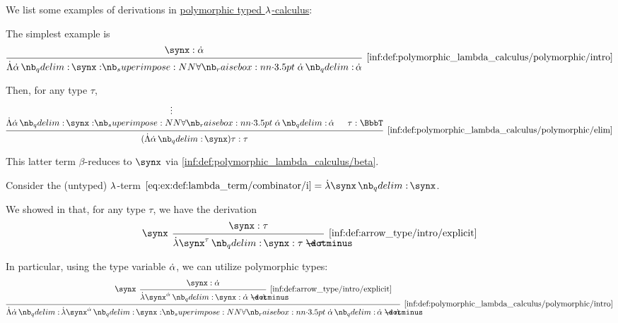 \begin{example}\label{ex:def:polymorphic_typed_lambda_calculus}
  We list some examples of derivations in \hyperref[def:polymorphic_typed_lambda_calculus]{polymorphic typed \( {\mathrm \lambda} \)-calculus}:
  \begin{thmenum}
     The simplest example is
    \begin{equation*}
      \begin{prooftree}
        \hypo{ \synx: \syn\alpha }
        \infer1[\ref{inf:def:polymorphic_lambda_calculus/polymorphic/intro}]{ \qAbs {\syn\alpha} \synx: \qforall {\syn\alpha} \syn\alpha }
      \end{prooftree}
    \end{equation*}

    Then, for any type \( \tau \),
    \begin{equation*}
      \begin{prooftree}
        \hypo{}
        \ellipsis {} { \qAbs {\syn\alpha} \synx: \qforall {\syn\alpha} \syn\alpha }

        \hypo{ \tau: \BbbT }

        \infer2[\ref{inf:def:polymorphic_lambda_calculus/polymorphic/elim}]{ (\qAbs {\syn\alpha} \synx) \tau: \tau }.
      \end{prooftree}
    \end{equation*}

    This latter term \( \beta \)-reduces to \( \synx \) via \ref{inf:def:polymorphic_lambda_calculus/beta}.

     Consider the (untyped) \( {\mathrm \lambda} \)-term \( \ref{eq:ex:def:lambda_term/combinator/i} = \qabs \synx \synx \).

    We showed in  that, for any type \( \tau \), we have the derivation
    \begin{equation*}
      \begin{prooftree}
        \hypo{ \synx: \tau }
        \infer[left label=\( \synx \)]1[\ref{inf:def:arrow_type/intro/explicit}]{ \qabs {\synx^\tau} \synx: \tau \synimplies \tau }
      \end{prooftree}
    \end{equation*}

    In particular, using the type variable \( \dot{\alpha} \), we can utilize polymorphic types:
    \begin{equation*}
      \begin{prooftree}
        \hypo{ \synx: \syn\alpha }
        \infer[left label=\( \synx \)]1[\ref{inf:def:arrow_type/intro/explicit}]{ \qabs {\synx^{\syn\alpha}} \synx: \syn\alpha \synimplies \syn\alpha }
        \infer1[\ref{inf:def:polymorphic_lambda_calculus/polymorphic/intro}]{ \qAbs {\syn\alpha} \qabs {\synx^{\syn\alpha}} \synx: \qforall {\syn\alpha} \syn\alpha \synimplies \syn\alpha }
      \end{prooftree}
    \end{equation*}


\end{thmenum}
\end{example}
